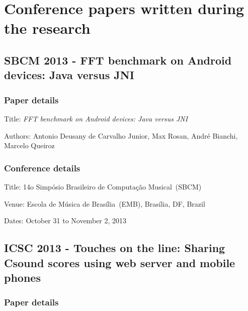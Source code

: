 
 




\chapter{Conference papers written during the research}
\label{ape:papers}


\section{SBCM 2013 - FFT benchmark on Android devices: Java versus JNI}
\label{ape:papersbcm2013}

\subsection*{Paper details}

Title: \textit{FFT benchmark on Android devices: Java versus JNI}

Authors: Antonio Deusany de Carvalho Junior, Max Rosan, André Bianchi, Marcelo Queiroz

\subsection*{Conference details}

Title: 14o Simpósio Brasileiro de Computação Musical~(SBCM)

Venue: Escola de Música de Brasília~(EMB), Brasília, DF, Brazil

Dates: October 31 to November 2, 2013



\section{ICSC 2013 - Touches on the line: Sharing Csound scores using web server and mobile phones}
\label{ape:papericsc2013}

\subsection*{Paper details}

